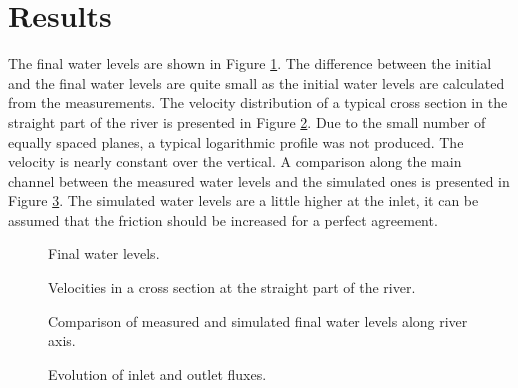 \section{Results}

The final water levels are shown in Figure \ref{t3d:Wesel:free_surface}. 
The difference between the initial and the final water levels are quite small
as the initial water levels are calculated from the measurements. 
The velocity distribution of a typical cross section in the straight part of the
river is presented in Figure \ref{t3d:Wesel:velo_cross}.
Due to the small number of equally spaced planes, a typical logarithmic profile
was not produced.
The velocity is nearly constant over the vertical.
A comparison along the main channel between the measured water levels and the
simulated ones is presented in Figure \ref{t3d:Wesel:diff_waterlevels}.
The simulated water levels are a little higher at the inlet, it can be assumed
that the friction should be increased for a perfect agreement.


\begin{figure} [h!]
\centering
{}
\caption{Final water levels.}
\label{t3d:Wesel:free_surface}
\end{figure}

\begin{figure} [h!]
\centering
{}
\caption{Velocities in a cross section at the straight part of the river.}
\label{t3d:Wesel:velo_cross}
\end{figure}

\begin{figure} [h!]
\centering
{}
\caption{Comparison of measured and simulated final water levels along river axis.}
\label{t3d:Wesel:diff_waterlevels}
\end{figure}

\begin{figure} [h!]
\centering
{}
\caption{Evolution of inlet and outlet fluxes.}
\label{t3d:Wesel:fluxes}
\end{figure}

